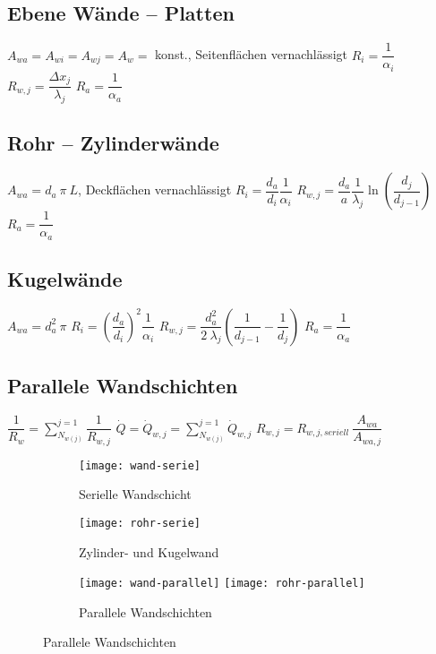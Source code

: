 \subsection{Ebene Wände -- Platten}
	$ A_{wa} = A_{wi} = A_{wj} = A_{w} = $ konst., Seitenflächen vernachlässigt
		\quad $ R_i = \dfrac{1}{\alpha_i} $
		\quad $ R_{w,j} = \dfrac{\Delta x_j}{\lambda_j} $
		\quad $ R_a = \dfrac{1}{\alpha_a} $

\subsection{Rohr -- Zylinderwände}
	$ A_{wa} = d_a\ \pi\ L $, Deckflächen vernachlässigt
		\qquad $ R_i = \dfrac{d_a}{d_i}   \dfrac{1}{\alpha_i}  $
		\qquad $ R_{w,j} = \dfrac{d_a}{a} \dfrac{1}{\lambda_j} \ln\left( \dfrac{d_j}{d_{j-1}} \right) $
		\qquad $ R_a = \dfrac{1}{\alpha_a} $

\subsection{Kugelwände}
	$ A_{wa} = d_a^2\ \pi $
		\qquad $ R_i = \left(\dfrac{d_a}{d_i}\right)^2 \dfrac{1}{\alpha_i} $
		\qquad $ R_{w,j} = \dfrac{d_a^2}{2\ \lambda_j} \left(\dfrac{1}{d_{j-1}} - \dfrac{1}{d_{j}}\right) $
		\qquad $ R_a = \dfrac{1}{\alpha_a} $

\subsection{Parallele Wandschichten}
	$ \dfrac{1}{R_w} = \displaystyle\sum_{N_{w(j)}}^{j=1}   \dfrac{1}{R_{w,j}} $
		\qquad $ \dot{Q} = \dot{Q}_{w,j} =  \displaystyle\sum_{N_{w(j)}}^{j=1}   \dot{Q}_{w,j}$
		\qquad $ R_{w,j} = R_{w,j,seriell}\ \dfrac{A_{wa}}{A_{wa,j}} $

\begin{figure}[h!]
	\centering
	\begin{subfigure}{0.24\textwidth}
		\centering
		\texttt{[image: wand-serie]}
		\caption{Serielle Wandschicht}
	\end{subfigure}
	\begin{subfigure}{0.28\textwidth}
		\centering
		\texttt{[image: rohr-serie]}
		\caption{Zylinder- und Kugelwand}
	\end{subfigure}
	\begin{subfigure}{0.45\textwidth}
		\centering
		\texttt{[image: wand-parallel]}
		\texttt{[image: rohr-parallel]}
		\caption{Parallele Wandschichten}
	\end{subfigure}
\end{figure}

